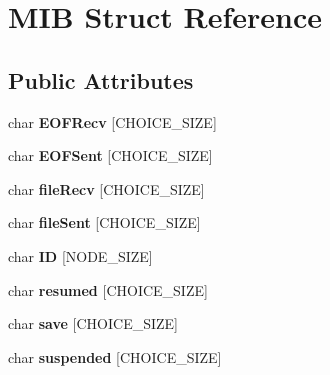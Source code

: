 \hypertarget{struct_m_i_b}{}\section{M\+IB Struct Reference}
\label{struct_m_i_b}
\subsection*{Public Attributes}
\begin{DoxyCompactItemize}
\item 
char {\bfseries E\+O\+F\+Recv} \mbox{[}C\+H\+O\+I\+C\+E\+\_\+\+S\+I\+ZE\mbox{]}\hypertarget{struct_m_i_b_a78814c0b7ecef3676e8cc31962f81e0b}{}\label{struct_m_i_b_a78814c0b7ecef3676e8cc31962f81e0b}

\item 
char {\bfseries E\+O\+F\+Sent} \mbox{[}C\+H\+O\+I\+C\+E\+\_\+\+S\+I\+ZE\mbox{]}\hypertarget{struct_m_i_b_a870b9fd10712b93d5e445bae372aeb6f}{}\label{struct_m_i_b_a870b9fd10712b93d5e445bae372aeb6f}

\item 
char {\bfseries file\+Recv} \mbox{[}C\+H\+O\+I\+C\+E\+\_\+\+S\+I\+ZE\mbox{]}\hypertarget{struct_m_i_b_a42bfa6c33713954f66c1829c59ff418f}{}\label{struct_m_i_b_a42bfa6c33713954f66c1829c59ff418f}

\item 
char {\bfseries file\+Sent} \mbox{[}C\+H\+O\+I\+C\+E\+\_\+\+S\+I\+ZE\mbox{]}\hypertarget{struct_m_i_b_a2a17c52b8eee5a9176edf4e8bdc240d6}{}\label{struct_m_i_b_a2a17c52b8eee5a9176edf4e8bdc240d6}

\item 
char {\bfseries ID} \mbox{[}N\+O\+D\+E\+\_\+\+S\+I\+ZE\mbox{]}\hypertarget{struct_m_i_b_aaade5496d0fdd3cb41c6fca9631e07dc}{}\label{struct_m_i_b_aaade5496d0fdd3cb41c6fca9631e07dc}

\item 
char {\bfseries resumed} \mbox{[}C\+H\+O\+I\+C\+E\+\_\+\+S\+I\+ZE\mbox{]}\hypertarget{struct_m_i_b_ae3f75a16b80dd605f6ae71d6ffb0e17c}{}\label{struct_m_i_b_ae3f75a16b80dd605f6ae71d6ffb0e17c}

\item 
char {\bfseries save} \mbox{[}C\+H\+O\+I\+C\+E\+\_\+\+S\+I\+ZE\mbox{]}\hypertarget{struct_m_i_b_a7c1a3686c6f4bb3c1a81d8c4091257e2}{}\label{struct_m_i_b_a7c1a3686c6f4bb3c1a81d8c4091257e2}

\item 
char {\bfseries suspended} \mbox{[}C\+H\+O\+I\+C\+E\+\_\+\+S\+I\+ZE\mbox{]}\hypertarget{struct_m_i_b_a9bd11b3b0c7aa8c09efcc921282afd37}{}\label{struct_m_i_b_a9bd11b3b0c7aa8c09efcc921282afd37}


\end{DoxyCompactItemize}
